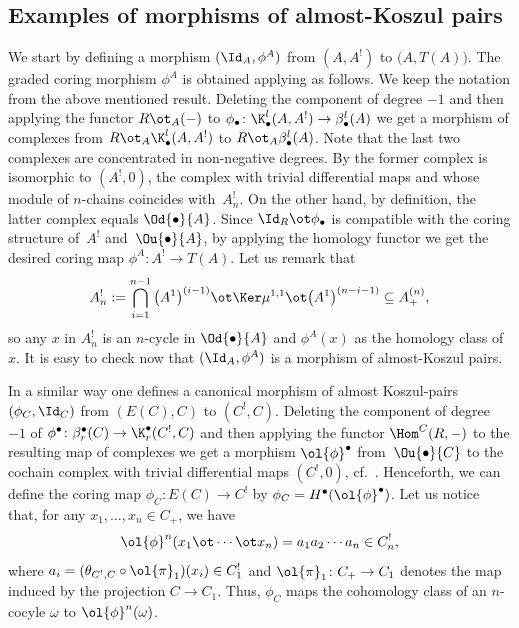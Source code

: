 \subsection{Examples of morphisms of almost-Koszul pairs}\label{fa:exemples_morphisms}
We start by def\/ining a morphism $(\Id_A,\phi^A)$ from $(A,A^!)$ to $\big(A,T(A)\big)$. The graded coring morphism $\phi^A$ is obtained applying \cite[Proposition 1.24]{jps} as follows. We keep the notation from the above mentioned result. Deleting the component of degree $-1$ and then applying the functor $R\ot_A (-)$ to $\phi _{\bullet}\colon \K_{\bullet}^{l}(A,A^!)\to \beta_{\bullet}^{l}(A)$ we get a morphism of complexes from $R\ot_A \K_{\bullet}^{l}(A,A^!)$ to $R\ot_A \beta_{\bullet}^{l}(A)$. Note that the last two complexes are concentrated in non-negative degrees. By \cite[Proposition 1.23]{jps} the former complex is isomorphic to $(A^!,0)$, the complex with tri\-vial dif\/ferential maps and whose module of $n$-chains coincides with~$A^!_n$. On the other hand, by def\/inition, the latter complex equals $\Od{\bullet}{A}$. Since $\Id_R\ot\phi_\bullet$ is compatible with the coring structure of~$A^!$ and~$\Ou{\bullet}{A}$, by applying the homology functor we get the desired coring map $\phi^A\colon A^!\to T(A)$. Let us remark that
\begin{gather*} A^!_n:=\bigcap_{i=1}^{n-1}\big({A^1}\big)^{(i-1)}\ot\Ker\mu^{1,1}\ot \big({A^1}\big)^{(n-i-1)}\subseteq A_+^{(n)},
\end{gather*}
so any $x$ in $A^!_n$ is an $n$-cycle in $\Od{\bullet}{A}$ and $\phi^A(x)$ as the homology class of $x$. It is easy to check now that $(\Id_A,\phi^A)$ is a morphism of almost-Koszul pairs.

In a similar way one def\/ines a canonical morphism of almost Koszul-pairs $(\phi_C,\Id_C)$ from $(E(C),C)$ to $(C^!,C)$. Deleting the component of degree $-1$ of $\phi ^{\bullet}\colon \beta^\bullet_{r}(C)\to \K^\bullet_{r}(C^!,C)$ and then applying the functor $\Hom^C(R, -)$ to the resulting map of complexes we get a morphism $\ol{\phi}^{\bullet}$ from~$\Ou{\bullet}{C}$ to the cochain complex with trivial dif\/ferential maps $(C^!,0)$, cf.\ \cite[Propositions~1.23 and~1.24]{jps}. Henceforth, we can def\/ine the coring map $\phi_C\colon E(C)\to C^!$ by $\phi_C=H^\bullet(\ol{\phi}^{\bullet})$. Let us notice that, for any $x_1,\dots,x_n\in C_+$, we have
\begin{gather*}
 \ol{\phi}^{n}(x_1\ot\cdots \ot x_n)=a_1a_2\cdots a_n\in C^!_n,
\end{gather*}
where $a_i= (\theta_{C^!,C}\circ\ol{\pi}_1)(x_i)\in C^!_1$ and $\ol{\pi}_1\colon C_+\to C_1$ denotes the map induced by the projection $C\to C_1$. Thus, $\phi_C$ maps the cohomology class of an $n$-cocyle $\omega$ to $ \ol{\phi}^{n}(\omega)$.
